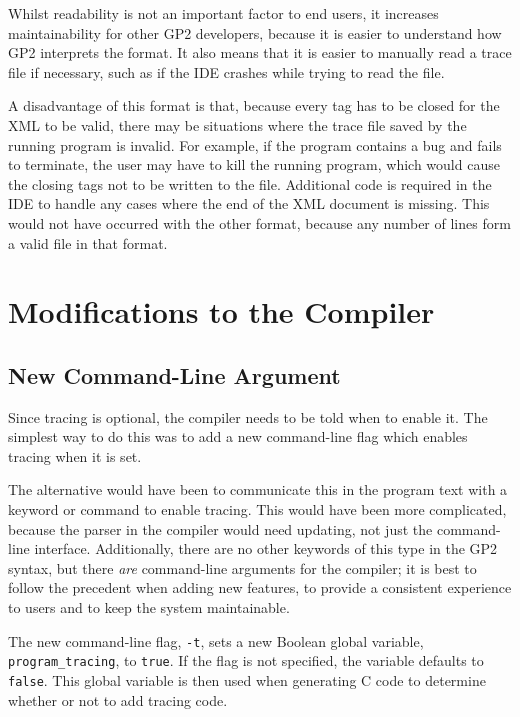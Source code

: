 \documentclass[authoryearcitations]{UoYCSproject}
\begin{document}
Whilst readability is not an important factor to end users, it increases
maintainability for other GP2 developers, because it is easier to understand
how GP2 interprets the format. It also means that it is easier to manually read
a trace file if necessary, such as if the IDE crashes while trying to read the
file.

A disadvantage of this format is that, because every tag has to be closed for
the XML to be valid, there may be situations where the trace file saved by the
running program is invalid. For example, if the program contains a bug and fails
to terminate, the user may have to kill the running program, which would cause
the closing tags not to be written to the file. Additional code is required in
the IDE to handle any cases where the end of the XML document is missing.
This would not have occurred with the other format, because any number of lines
form a valid file in that format.


\section{Modifications to the Compiler}

\subsection{New Command-Line Argument}

Since tracing is optional, the compiler needs to be told when to enable it. The
simplest way to do this was to add a new command-line flag which enables tracing
when it is set.

The alternative would have been to communicate this in the program text with a
keyword or command to enable tracing. This would have been more complicated,
because the parser in the compiler would need updating, not just the command-line
interface. Additionally, there are no other keywords of this type in the GP2
syntax, but there \emph{are} command-line arguments for the compiler; it is best
to follow the precedent when adding new features, to provide a consistent
experience to users and to keep the system maintainable.

The new command-line flag, \texttt{-t}, sets a new Boolean global variable,
\texttt{program\_tracing}, to \texttt{true}. If the flag is not specified, the
variable defaults to \texttt{false}. This global variable is then used when
generating C code to determine whether or not to add tracing code.
\end{document}
